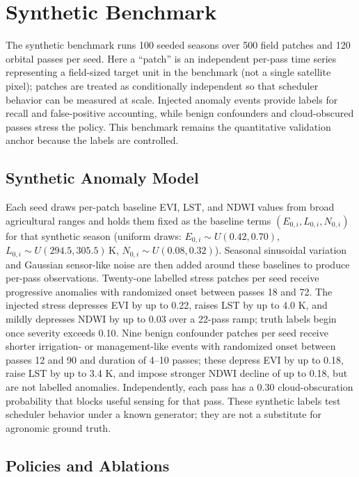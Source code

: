 \documentclass[11pt]{article}
\begin{document}
\section{Synthetic Benchmark}

The synthetic benchmark runs 100 seeded seasons over 500 field patches and 120 orbital passes per seed. Here a ``patch'' is an independent per-pass time series representing a field-sized target unit in the benchmark (not a single satellite pixel); patches are treated as conditionally independent so that scheduler behavior can be measured at scale. Injected anomaly events provide labels for recall and false-positive accounting, while benign confounders and cloud-obscured passes stress the policy. This benchmark remains the quantitative validation anchor because the labels are controlled.

\subsection{Synthetic Anomaly Model}

Each seed draws per-patch baseline EVI, LST, and NDWI values from broad agricultural ranges and holds them fixed as the baseline terms $(E_{0,i},L_{0,i},N_{0,i})$ for that synthetic season (uniform draws: $E_{0,i}\!\sim\!U(0.42,0.70)$, $L_{0,i}\!\sim\!U(294.5,305.5)$\,K, $N_{0,i}\!\sim\!U(0.08,0.32)$). Seasonal sinusoidal variation and Gaussian sensor-like noise are then added around these baselines to produce per-pass observations. Twenty-one labelled stress patches per seed receive progressive anomalies with randomized onset between passes 18 and 72. The injected stress depresses EVI by up to 0.22, raises LST by up to 4.0 K, and mildly depresses NDWI by up to 0.03 over a 22-pass ramp; truth labels begin once severity exceeds 0.10. Nine benign confounder patches per seed receive shorter irrigation- or management-like events with randomized onset between passes 12 and 90 and duration of 4--10 passes; these depress EVI by up to 0.18, raise LST by up to 3.4 K, and impose stronger NDWI decline of up to 0.18, but are not labelled anomalies. Independently, each pass has a 0.30 cloud-obscuration probability that blocks useful sensing for that pass. These synthetic labels test scheduler behavior under a known generator; they are not a substitute for agronomic ground truth.

\subsection{Policies and Ablations}
\end{document}
